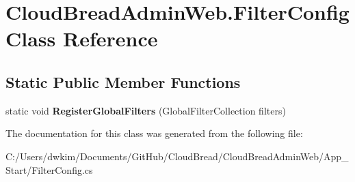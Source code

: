 \hypertarget{a00078}{}\section{Cloud\+Bread\+Admin\+Web.\+Filter\+Config Class Reference}
\label{a00078}
\subsection*{Static Public Member Functions}
\begin{DoxyCompactItemize}
\item 
static void {\bfseries Register\+Global\+Filters} (Global\+Filter\+Collection filters)\hypertarget{a00078_a9db9bd1f7026c29c5e41847e671ebf9c}{}\label{a00078_a9db9bd1f7026c29c5e41847e671ebf9c}

\end{DoxyCompactItemize}


The documentation for this class was generated from the following file\+:\begin{DoxyCompactItemize}
\item 
C\+:/\+Users/dwkim/\+Documents/\+Git\+Hub/\+Cloud\+Bread/\+Cloud\+Bread\+Admin\+Web/\+App\+\_\+\+Start/Filter\+Config.\+cs\end{DoxyCompactItemize}
